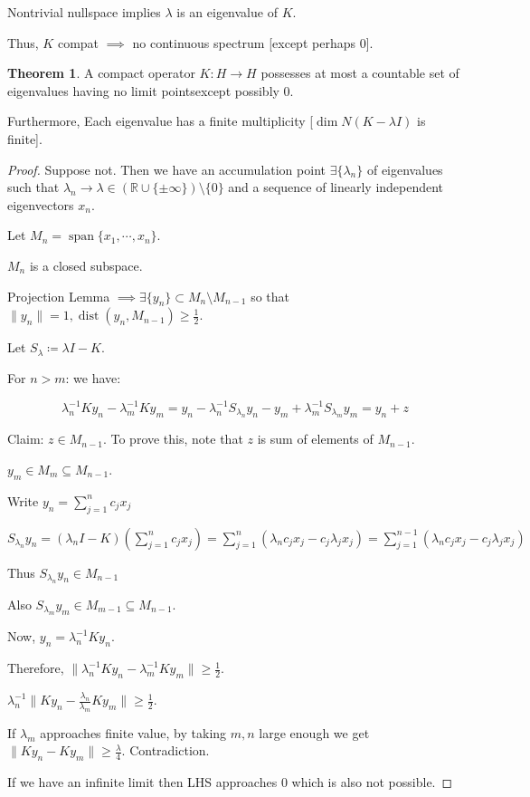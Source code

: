 \documentclass{article}
\theoremstyle{definition}
\newtheorem{theorem}{Theorem}
\begin{document}
Nontrivial nullspace implies \(\lambda\) is an eigenvalue of \(K\).

Thus, \(K\) compat \(\implies\) no continuous spectrum [except perhaps \(0\)].

\begin{theorem}
    A compact operator \(K: H \to H\) possesses at most a countable set of eigenvalues having no limit pointsexcept possibly \(0\).
    
    Furthermore, Each eigenvalue has a finite multiplicity [\(\dim N(K-\lambda I)\) is finite].
\end{theorem}

\begin{proof}
    Suppose not. Then we have an accumulation point \(\exists \{ \lambda_n \}\) of eigenvalues such that \(\lambda_n \to \lambda \in (\mathbb{R} \cup \{ \pm \infty \}) \setminus \{ 0 \} \) and a sequence of linearly independent eigenvectors \(x_n\).
    
    Let \(M_n = \operatorname{span} \{ x_1, \cdots , x_n \}\). 

    \(M_n\) is a closed subspace.

    Projection Lemma \(\implies \exists \{ y_n \} \subset M_n \setminus M_{n-1}\) so that \(\lVert y_n \rVert = 1, \operatorname{dist} (y_n, M_{n-1})\geq \frac{1}{2}\).
    
    Let \(S_\lambda \coloneqq \lambda I - K\).

    For \(n > m\): we have:

    \[
        \lambda_n ^{-1} K y _n - \lambda_m ^{-1} K y_m = y_n - \lambda_n ^{-1} S _{\lambda_n} y_n - y_m + \lambda_m ^{-1} S_{\lambda_m} y_m = y_n + z
    \]

    Claim: \(z \in M_{n-1}\). To prove this, note that \(z\) is sum of elements of \(M_{n-1}\).
    
    \(y_m \in M_m \subseteq M_{n-1}\).

    Write \(y_n = \sum_{j=1}^n c_j x_j\) 

    \(S_{\lambda_n} y_n = (\lambda_n I - K) \left( \sum_{j=1}^n c_j x_j \right) = \sum_{j=1}^n (\lambda_n c_j x_j - c_j \lambda_j x_j) = \sum_{j=1}^{n-1} (\lambda_n c_j x_j - c_j \lambda_j x_j) \)

    Thus \(S_{\lambda_n}y_n \in M_{n-1}\)

    Also \(S_{\lambda_m}y_m \in M_{m-1} \subseteq M_{n-1}\).

    Now, \(y_n = \lambda_n ^{-1} K y _n\). 

    Therefore, \(\lVert \lambda_n ^{-1} K y_n - \lambda_m ^{-1} K y_m \rVert \geq \frac{1}{2} \).
    
    \(\lambda_n ^{-1} \lVert K y_n - \frac{\lambda_n}{\lambda_m} K y_m \rVert \geq \frac{1}{2}\).

    If \(\lambda_m\) approaches finite value, by taking \(m,n\) large enough we get \(\lVert K y_n - K y_m \rVert \geq \frac{\lambda}{4}\). Contradiction.

    If we have an infinite limit then LHS approaches \(0\) which is also not possible.

\end{proof}
\end{document}
